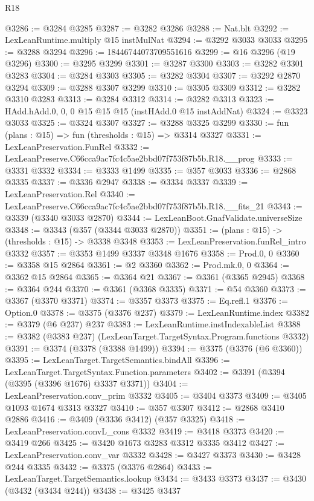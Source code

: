 \begin{lexlean}{R18}
\begin{coremodule}
{{{{{{{{{{{{{{{{{{{@3286 := @3284 @3285
@3287 := @3282 @3286
@3288 := Nat.blt
@3292 := LexLeanRuntime.multiply @15 instMulNat
@3294 := @3292 @3033 @3033
@3295 := @3288 @3294
@3296 := 18446744073709551616
@3299 := @16 @3296 (@19 @3296)
@3300 := @3295 @3299
@3301 := @3287 @3300
@3303 := @3282 @3301 @3283
@3304 := @3284 @3303
@3305 := @3282 @3304
@3307 := @3292 @2870 @3294
@3309 := @3288 @3307 @3299
@3310 := @3305 @3309
@3312 := @3282 @3310 @3283
@3313 := @3284 @3312
@3314 := @3282 @3313
@3323 := HAdd.hAdd.{0, 0, 0} @15 @15 @15 (instHAdd.{0} @15 instAddNat)
@3324 := @3323 @3033
@3325 := @3324 @3307
@3327 := @3288 @3325 @3299
@3330 := fun (plans : @15) => fun (thresholds : @15) => @3314 @3327
@3331 := LexLeanPreservation.FunRel
@3332 := LexLeanPreserve.C66cca9ac7fc4c5ae2bbd07f753f87b5b.R18.__prog
@3333 := @3331 @3332
@3334 := @3333 @1499
@3335 := @357 @3033
@3336 := @2868 @3335
@3337 := @3336 @2947
@3338 := @3334 @3337
@3339 := LexLeanPreservation.Rel
@3340 := LexLeanPreserve.C66cca9ac7fc4c5ae2bbd07f753f87b5b.R18.__fits_21
@3343 := @3339 (@3340 @3033 @2870)
@3344 := LexLeanBoot.GnafValidate.universeSize
@3348 := @3343 (@357 (@3344 @3033 @2870))
@3351 := (plans : @15) -> (thresholds : @15) -> @3338 @3348
@3353 := LexLeanPreservation.funRel_intro @3332
@3357 := @3353 @1499 @3337 @3348 @1676
@3358 := Prod.{0, 0}
@3360 := @3358 @15 @2864
@3361 := @2 @3360
@3362 := Prod.mk.{0, 0}
@3364 := @3362 @15 @2864
@3365 := @3364 @21
@3367 := @3361 (@3365 @2945)
@3368 := @3364 @244
@3370 := @3361 (@3368 @3335)
@3371 := @54 @3360
@3373 := @3367 (@3370 @3371)
@3374 := @3357 @3373
@3375 := Eq.refl.{1}
@3376 := Option.{0}
@3378 := @3375 (@3376 @237)
@3379 := LexLeanRuntime.index
@3382 := @3379 (@6 @237) @237
@3383 := LexLeanRuntime.instIndexableList
@3388 := @3382 (@3383 @237) (LexLeanTarget.TargetSyntax.Program.functions @3332)
@3391 := @3374 (@3378 (@3388 @1499))
@3394 := @3375 (@3376 (@6 @3360))
@3395 := LexLeanTarget.TargetSemantics.bindAll
@3396 := LexLeanTarget.TargetSyntax.Function.parameters
@3402 := @3391 (@3394 (@3395 (@3396 @1676) @3337 @3371))
@3404 := LexLeanPreservation.conv_prim @3332
@3405 := @3404 @3373
@3409 := @3405 @1093 @1674 @3313 @3327
@3410 := @357 @3307
@3412 := @2868 @3410 @2886
@3416 := @3409 (@3336 @3412) (@357 @3325)
@3418 := LexLeanPreservation.convL_cons @3332
@3419 := @3418 @3373
@3420 := @3419 @266
@3425 := @3420 @1673 @3283 @3312 @3335 @3412
@3427 := LexLeanPreservation.conv_var @3332
@3428 := @3427 @3373
@3430 := @3428 @244 @3335
@3432 := @3375 (@3376 @2864)
@3433 := LexLeanTarget.TargetSemantics.lookup
@3434 := @3433 @3373
@3437 := @3430 (@3432 (@3434 @244))
@3438 := @3425 @3437
}}}}}}}}}}}}}}}}}}}
\end{coremodule}
\end{lexlean}
